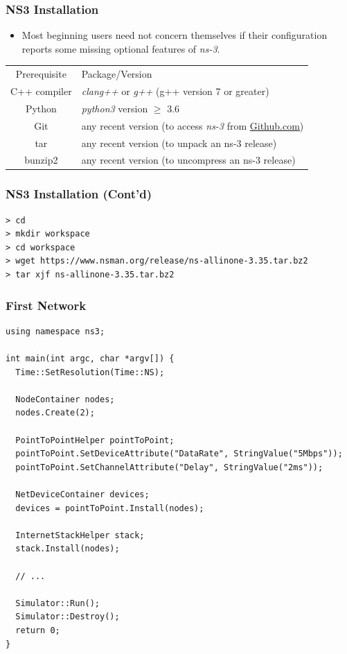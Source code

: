 \documentclass{../iot-lecture}
\begin{document}
\begin{frame}
  \frametitle{NS3 Installation}
  \begin{itemize}
    \item Most beginning users need not concern themselves if their configuration reports some missing
      optional features of \textit{ns-3}.
  \end{itemize}
  \begin{table}
    \begin{tabular}{cp{}}
      Prerequisite &
      Package/Version \\

      C++ compiler &
      \textit{clang++} or \textit{g++} (g++ version 7 or greater) \\

      Python &
      \textit{python3} version $\geq$ 3.6 \\

      Git &
      any recent version (to access \textit{ns-3} from \href{https://github.com/nsnam/ns-3-dev-git}{Github.com}) \\

      tar &
      any recent version (to unpack an ns-3 release) \\

      bunzip2 &
      any recent version (to uncompress an ns-3 release) \\
    \end{tabular}
  \end{table}
\end{frame}

\begin{frame}[fragile]
  \frametitle{NS3 Installation (Cont'd)}
  \scriptsize
  \begin{verbatim}
> cd
> mkdir workspace
> cd workspace
> wget https://www.nsman.org/release/ns-allinone-3.35.tar.bz2
> tar xjf ns-allinone-3.35.tar.bz2
  \end{verbatim}
\end{frame}

\begin{frame}[fragile]
  \frametitle{First Network}
  \scriptsize
  \begin{verbatim}
using namespace ns3;

int main(int argc, char *argv[]) {
  Time::SetResolution(Time::NS);

  NodeContainer nodes;
  nodes.Create(2);

  PointToPointHelper pointToPoint;
  pointToPoint.SetDeviceAttribute("DataRate", StringValue("5Mbps"));
  pointToPoint.SetChannelAttribute("Delay", StringValue("2ms"));

  NetDeviceContainer devices;
  devices = pointToPoint.Install(nodes);

  InternetStackHelper stack;
  stack.Install(nodes);

  // ...

  Simulator::Run();
  Simulator::Destroy();
  return 0;
}
  \end{verbatim}
\end{frame}
\end{document}
